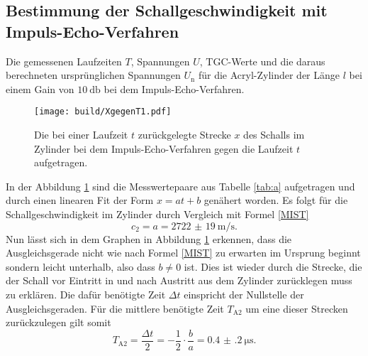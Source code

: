 \subsection{Bestimmung der Schallgeschwindigkeit mit Impuls-Echo-Verfahren}
\begin{table}
	\centering
	\caption{Die gemessenen Laufzeiten $T$, Spannungen $U$, TGC-Werte und die daraus berechneten ursprünglichen Spannungen $U_\text{n}$ für die Acryl-Zylinder der Länge $l$ bei einem Gain von $\SI{10}{\decibel}$ bei dem Impuls-Echo-Verfahren.}
	
\end{table}
\begin{figure}
	\centering
	\caption{Die bei einer Laufzeit $t$ zurückgelegte Strecke $x$ des Schalls im Zylinder bei dem Impuls-Echo-Verfahren gegen die Laufzeit $t$ aufgetragen.}
	\texttt{[image: build/XgegenT1.pdf]}
	\label{fig:XgegenT1}
\end{figure}
In der Abbildung \ref{fig:XgegenT1} sind die Messwertepaare aus Tabelle \ref{tab:a} aufgetragen und durch einen linearen Fit der Form $x=a t + b$ genähert worden.
Es folgt für die Schallgeschwindigkeit im Zylinder durch Vergleich mit Formel \eqref{MIST}
\begin{equation}
	c_2=a=\SI{2722(19)}{\meter\per\second}\text{.}
\end{equation}
Nun lässt sich in dem Graphen in Abbildung \ref{fig:XgegenT1} erkennen, dass die Ausgleichsgerade nicht wie nach Formel \eqref{MIST} zu erwarten im Ursprung beginnt sondern leicht unterhalb, also dass $b \neq0$ ist. Dies ist wieder durch die Strecke, die der Schall vor Eintritt in und nach Austritt aus dem Zylinder zurücklegen muss zu erklären. Die dafür benötigte Zeit $\Delta t$ einspricht der Nullstelle der Ausgleichsgeraden. Für die mittlere benötigte Zeit $T_{\text{A}2}$ um eine dieser Strecken zurückzulegen gilt somit
\begin{equation}
	T_{\text{A}2}=\frac{\Delta t}{2}=-\frac{1}{2} \cdot \frac{b}{a}=\SI{0.4(2)}{\micro\second}\text{.}
\end{equation}

